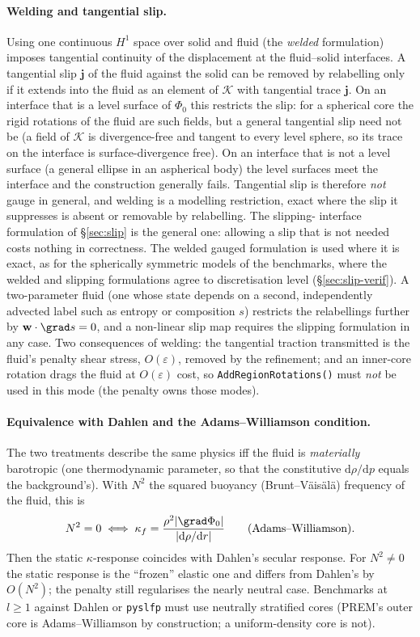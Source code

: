 \documentclass[11pt]{article}
\numberwithin{equation}{section}
\theoremstyle{remark}
\newcommand{\eps}{\varepsilon}
\newcommand{\vw}{\mathbf{w}}
\newcommand{\code}[1]{\texttt{#1}}
\begin{document}
\paragraph{Welding and tangential slip.} Using one continuous $H^1$ space
over solid and fluid (the \emph{welded} formulation) imposes tangential
continuity of the displacement at the fluid--solid interfaces. A
tangential slip $\mathbf{j}$ of the fluid against the solid can be removed
by relabelling only if it extends into the fluid as an element of
$\mathcal{K}$ with tangential trace $\mathbf{j}$. On an interface that is a
level surface of $\Phi_0$ this restricts the slip: for a spherical core
the rigid rotations of the fluid are such fields, but a general tangential
slip need not be (a field of $\mathcal{K}$ is divergence-free and tangent
to every level sphere, so its trace on the interface is surface-divergence
free). On an interface that is not a level surface (a general ellipse in
an aspherical body) the level surfaces meet the interface and the
construction generally fails. Tangential slip is therefore \emph{not}
gauge in general, and welding is a modelling restriction, exact where the
slip it suppresses is absent or removable by relabelling. The slipping-%
interface formulation of \S\ref{sec:slip} is the general one: allowing a
slip that is not needed costs nothing in correctness. The welded gauged
formulation is used where it is exact, as for the spherically symmetric
models of the benchmarks, where the welded and slipping formulations agree
to discretisation level (\S\ref{sec:slip-verif}). A two-parameter fluid
(one whose state depends on a second, independently advected label such as
entropy or composition $s$) restricts the relabellings further by
$\vw\cdot\grad s = 0$, and a non-linear slip map requires the slipping
formulation in any case. Two consequences of welding: the tangential
traction transmitted is the fluid's penalty shear stress, $O(\eps)$,
removed by the refinement; and an inner-core rotation drags the fluid at
$O(\eps)$ cost, so \code{AddRegionRotations()} must \emph{not} be used in
this mode (the penalty owns those modes).

\paragraph{Equivalence with Dahlen and the Adams--Williamson condition.}
The two treatments describe the same physics iff the fluid is
\emph{materially} barotropic (one thermodynamic parameter, so that the
constitutive $\mathrm{d}\rho/\mathrm{d}p$ equals the background's). With
$N^2$ the squared buoyancy (Brunt--V\"ais\"al\"a) frequency of the fluid,
this is
\begin{equation}
  N^2 = 0 \iff \kappa_f = \frac{\rho^2|\grad\Phi_0|}{|\mathrm{d}\rho/\mathrm{d}r|}
  \qquad\text{(Adams--Williamson)} .
\end{equation}
Then the static $\kappa$-response coincides with Dahlen's secular
response. For $N^2\neq0$ the static response is the ``frozen'' elastic one
and differs from Dahlen's by $O(N^2)$; the penalty still regularises the
nearly neutral case. Benchmarks at $l\ge1$ against Dahlen or \code{pyslfp} must
use neutrally stratified cores (PREM's outer core is Adams--Williamson by
construction; a uniform-density core is not).
\end{document}
